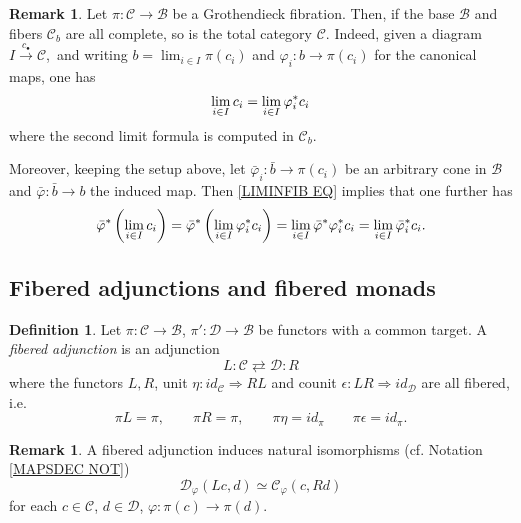 \documentclass[a4paper,10pt
]{article}%
\numberwithin{equation}{section}
\numberwithin{figure}{section}
\theoremstyle{definition} %
\newtheorem{definition}[equation]{Definition}%
\newtheorem{remark}[equation]{Remark}%
\newcommand{\1}{\ensuremath{\mathbbm 1}}%
\begin{document}
\begin{remark}\label{LIMINFIBSUP REM}
	Let $\pi \colon \mathcal{C} \to \mathcal{B}$ be a Grothendieck fibration.
	Then, if the base $\mathcal{B}$ and fibers 
	$\mathcal{C}_b$
	are all complete, so is the total category $\mathcal{C}$.
	Indeed, given a diagram $I \xrightarrow{c_{\bullet}} \mathcal{C}$,\
	and writing
	$b = \lim_{i \in I} \pi(c_i)$
	and 
	$\varphi_i \colon b \to \pi(c_i)$
	for the canonical maps,
	one has
	\begin{equation}\label{LIMINFIB EQ}
	\lim_{i \in I} c_i = 
	\lim_{i \in I} \varphi_{i}^{\**}c_i
	\end{equation}
	where the second limit formula is computed in $\mathcal{C}_b$.
	
	Moreover, keeping the setup above, let $\bar{\varphi}_i \colon \bar{b} \to \pi(c_i)$
	be an arbitrary cone in $\mathcal{B}$
	and $\bar{\varphi} \colon \bar{b} \to b$
	the induced map.
	Then \eqref{LIMINFIB EQ} implies that one further has
	\begin{equation}\label{LIMINFIBSUP EQ}
	\bar{\varphi}^{\**}\left(\lim_{i \in I} c_i\right) 
	= 
	\bar{\varphi}^{\**}\left(\lim_{i \in I} \varphi_{i}^{\**}c_i\right)
	=
	\lim_{i \in I} \bar{\varphi}^{\**} \varphi_{i}^{\**}c_i
	=
	\lim_{i \in I} \bar{\varphi}_{i}^{\**}c_i.
	\end{equation}
\end{remark}





\subsection{Fibered adjunctions and fibered monads}
\label{FIBCAT_SEC}



\begin{definition}\label{FIBADJ DEF}
	Let 
	$\pi \colon \mathcal{C} \to \mathcal{B}$,
	$\pi' \colon \mathcal{D} \to \mathcal{B}$
	be functors with a common target.
	A \emph{fibered adjunction} is an adjunction
	\[
	L \colon \mathcal{C} \rightleftarrows \mathcal{D} \colon R
	\]
	where the functors $L,R$, 
	unit $\eta \colon id_{\mathcal{C}} \Rightarrow RL$ and 
	counit $\epsilon \colon LR \Rightarrow id_{\mathcal{D}}$
	are all fibered, i.e.
	\[
	\pi L=\pi, \qquad
	\pi R = \pi, \qquad
	\pi \eta = id_{\pi} \qquad 
	\pi\epsilon = id_{\pi}.
	\]
\end{definition}



\begin{remark}
	A fibered adjunction induces natural isomorphisms
	(cf. Notation \ref{MAPSDEC NOT})
	\[
	\mathcal{D}_{\varphi}\left(Lc,d\right)
	\simeq
	\mathcal{C}_{\varphi}\left(c,Rd\right)
	\]
	for each $c\in \mathcal{C}$, $d \in \mathcal{D}$, 
	$\varphi \colon \pi(c)\to \pi(d)$. 
\end{remark}
\end{document}
